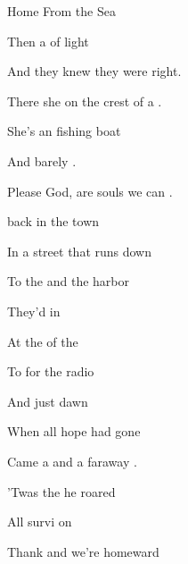 \begin{SBSong}{Home From the Sea}
\begin{SBVerse}
    Then a  of light

    And they knew they were right.

    There she  on the crest of a .

    She's an  fishing boat

    And  barely .

    Please God,  are souls we can .
  \end{SBVerse}
  \WBPageBrk
  \begin{SBVerse}
     back in the town

    In a street that runs down

    To the  and the harbor 

    They'd  in 

    At the  of the 

    To  for the radio 

    And just  dawn

    When all hope had gone

    Came a  and a faraway .

    'Twas the  he roared

    All survi on 

    Thank  and we're homeward 
  \end{SBVerse}
\end{SBSong}